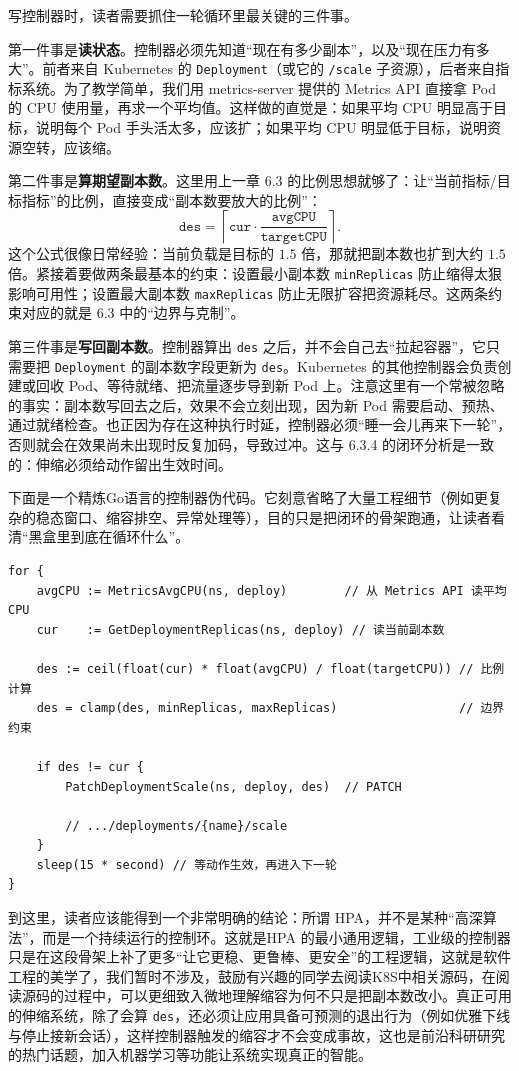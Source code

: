 写控制器时，读者需要抓住一轮循环里最关键的三件事。

第一件事是\textbf{读状态}。控制器必须先知道“现在有多少副本”，以及“现在压力有多大”。前者来自 Kubernetes 的 \texttt{Deployment}（或它的 \texttt{/scale} 子资源），后者来自指标系统。为了教学简单，我们用 metrics-server 提供的 Metrics API 直接拿 Pod 的 CPU 使用量，再求一个平均值。这样做的直觉是：如果平均 CPU 明显高于目标，说明每个 Pod 手头活太多，应该扩；如果平均 CPU 明显低于目标，说明资源空转，应该缩。

第二件事是\textbf{算期望副本数}。这里用上一章 6.3 的比例思想就够了：让“当前指标/目标指标”的比例，直接变成“副本数要放大的比例”：
\[
\texttt{des}=\left\lceil \texttt{cur}\cdot\frac{\texttt{avgCPU}}{\texttt{targetCPU}}\right\rceil.
\]
这个公式很像日常经验：当前负载是目标的 $1.5$ 倍，那就把副本数也扩到大约 $1.5$ 倍。紧接着要做两条最基本的约束：设置最小副本数 \texttt{minReplicas} 防止缩得太狠影响可用性；设置最大副本数 \texttt{maxReplicas} 防止无限扩容把资源耗尽。这两条约束对应的就是 6.3 中的“边界与克制”。

第三件事是\textbf{写回副本数}。控制器算出 \texttt{des} 之后，并不会自己去“拉起容器”，它只需要把 \texttt{Deployment} 的副本数字段更新为 \texttt{des}。Kubernetes 的其他控制器会负责创建或回收 Pod、等待就绪、把流量逐步导到新 Pod 上。注意这里有一个常被忽略的事实：副本数写回去之后，效果不会立刻出现，因为新 Pod 需要启动、预热、通过就绪检查。也正因为存在这种执行时延，控制器必须“睡一会儿再来下一轮”，否则就会在效果尚未出现时反复加码，导致过冲。这与 6.3.4 的闭环分析是一致的：伸缩必须给动作留出生效时间。

下面是一个精炼Go语言的控制器伪代码。它刻意省略了大量工程细节（例如更复杂的稳态窗口、缩容排空、异常处理等），目的只是把闭环的骨架跑通，让读者看清“黑盒里到底在循环什么”。

\begin{verbatim}
for {
    avgCPU := MetricsAvgCPU(ns, deploy)        // 从 Metrics API 读平均 CPU
    cur    := GetDeploymentReplicas(ns, deploy) // 读当前副本数

    des := ceil(float(cur) * float(avgCPU) / float(targetCPU)) // 比例计算
    des = clamp(des, minReplicas, maxReplicas)                 // 边界约束

    if des != cur {
        PatchDeploymentScale(ns, deploy, des)  // PATCH 
        
        // .../deployments/{name}/scale
    }
    sleep(15 * second) // 等动作生效，再进入下一轮
}
\end{verbatim}

到这里，读者应该能得到一个非常明确的结论：所谓 HPA，并不是某种“高深算法”，而是一个持续运行的控制环。这就是HPA 的最小通用逻辑，工业级的控制器只是在这段骨架上补了更多“让它更稳、更鲁棒、更安全”的工程逻辑，这就是软件工程的美学了，我们暂时不涉及，鼓励有兴趣的同学去阅读K8S中相关源码，在阅读源码的过程中，可以更细致入微地理解缩容为何不只是把副本数改小。真正可用的伸缩系统，除了会算 \texttt{des}，还必须让应用具备可预测的退出行为（例如优雅下线与停止接新会话），这样控制器触发的缩容才不会变成事故，这也是前沿科研研究的热门话题，加入机器学习等功能让系统实现真正的智能。

